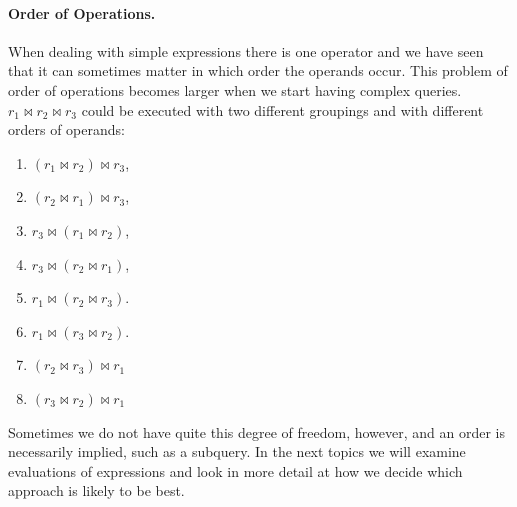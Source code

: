 \paragraph{Order of Operations.} When dealing with simple expressions there is one operator and we have seen that it can sometimes matter in which order the operands occur. This problem of order of operations becomes larger when we start having complex queries. $r_{1} \bowtie r_{2} \bowtie r_{3}$ could be executed with two different groupings and with different orders of operands: 
\begin{enumerate}
\item $(r_{1} \bowtie r_{2}) \bowtie r_{3}$,  
\item $(r_{2} \bowtie r_{1}) \bowtie r_{3}$, 
\item $r_{3} \bowtie (r_{1} \bowtie r_{2})$,
\item $r_{3} \bowtie (r_{2} \bowtie r_{1})$,
\item $r_{1} \bowtie (r_{2} \bowtie r_{3})$. 
\item $r_{1} \bowtie (r_{3} \bowtie r_{2})$. 
\item $(r_{2} \bowtie r_{3}) \bowtie r_{1}$
\item $(r_{3} \bowtie r_{2}) \bowtie r_{1}$
\end{enumerate}

Sometimes we do not have quite this degree of freedom, however, and an order is necessarily implied, such as a subquery. In the next topics we will examine evaluations of expressions and look in more detail at how we decide which approach is likely to be best.




